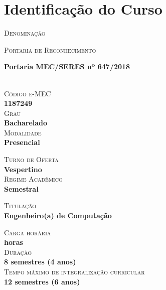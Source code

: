 \chapter{Identificação do Curso}


\begin{center}
\parbox{0.8\textwidth}{
    \textsc{\small \textcolor{AzulClaro}{Denominação}} \\ \hspace*{15mm} \parbox{0.45\textwidth}{\textbf{\nomecursonovo}\footnotemark}
}

\parbox{0.8\textwidth}{
    \textsc{\small \textcolor{AzulClaro}{Portaria de Reconhecimento}} \\ \hspace*{15mm} \parbox{0.45\textwidth}{\textbf{Portaria MEC/SERES nº 647/2018}}\\
    \textsc{\small \textcolor{AzulClaro}{Código e-MEC}} \\ \hspace*{15mm} \textbf{1187249}\\%
    \textsc{\small \textcolor{AzulClaro}{Grau}} \\ \hspace*{15mm} \textbf{Bacharelado}\\
    \textsc{\small \textcolor{AzulClaro}{Modalidade}} \\ \hspace*{15mm} \textbf{Presencial}\\
}
\parbox{0.8\textwidth}{
    \textsc{\small \textcolor{AzulClaro}{Turno de Oferta}} \\ \hspace*{15mm} \textbf{Vespertino\footnotemark}\\
    \textsc{\small \textcolor{AzulClaro}{Regime Acadêmico}} \\ \hspace*{15mm} \textbf{Semestral}
}

\parbox{0.8\textwidth}{
    \textsc{\small \textcolor{AzulClaro}{Titulação}} \\ \hspace*{15mm} \textbf{Engenheiro(a) de Computação} 
}

\parbox{0.8\textwidth}{
    \textsc{\small \textcolor{AzulClaro}{Carga horária}} \\ \hspace*{15mm} \textbf{ horas}\\
    \textsc{\small \textcolor{AzulClaro}{Duração}} \\ \hspace*{15mm} \textbf{8 semestres (4 anos)}\\
    \textsc{\small \textcolor{AzulClaro}{Tempo máximo de integralização curricular}} \\ \hspace*{15mm} \textbf{12 semestres (6 anos)}\\
}
    

\end{center}
